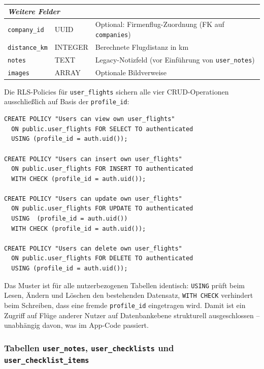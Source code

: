 \begin{table}[H]
\begin{tabularx}{\textwidth}{l l X}
    \midrule
    \multicolumn{3}{l}{\textit{Weitere Felder}} \\
    \midrule
    \texttt{company\_id}       & UUID    & Optional: Firmenflug-Zuordnung (FK auf \texttt{companies}) \\
    \texttt{distance\_km}      & INTEGER & Berechnete Flugdistanz in km \\
    \texttt{notes}             & TEXT    & Legacy-Notizfeld (vor Einführung von \texttt{user\_notes}) \\
    \texttt{images}            & ARRAY   & Optionale Bildverweise \\
    \bottomrule
  \end{tabularx}
\end{table}

Die RLS-Policies für \texttt{user\_flights} sichern alle vier CRUD-Operationen
ausschließlich auf Basis der \texttt{profile\_id}:

\begin{lstlisting}[style=skyline-sql,
  caption={RLS-Policies für \texttt{user\_flights} (supabasesql.txt)},
  label={lst:rls_flights}]
CREATE POLICY "Users can view own user_flights"
  ON public.user_flights FOR SELECT TO authenticated
  USING (profile_id = auth.uid());

CREATE POLICY "Users can insert own user_flights"
  ON public.user_flights FOR INSERT TO authenticated
  WITH CHECK (profile_id = auth.uid());

CREATE POLICY "Users can update own user_flights"
  ON public.user_flights FOR UPDATE TO authenticated
  USING  (profile_id = auth.uid())
  WITH CHECK (profile_id = auth.uid());

CREATE POLICY "Users can delete own user_flights"
  ON public.user_flights FOR DELETE TO authenticated
  USING (profile_id = auth.uid());
\end{lstlisting}

Das Muster ist für alle nutzerbezogenen Tabellen identisch:
\texttt{USING} prüft beim Lesen, Ändern und Löschen den bestehenden Datensatz,
\texttt{WITH CHECK} verhindert beim Schreiben, dass eine fremde
\texttt{profile\_id} eingetragen wird.
Damit ist ein Zugriff auf Flüge anderer Nutzer auf Datenbankebene strukturell
ausgeschlossen -- unabhängig davon, was im App-Code passiert.

\subsubsection*{Tabellen \texttt{user\_notes}, \texttt{user\_checklists}
                und \texttt{user\_checklist\_items}}

